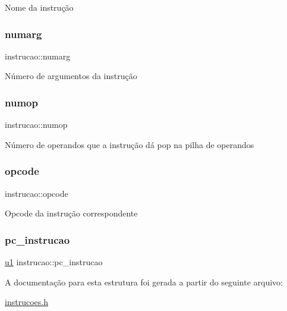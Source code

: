 Nome da instrução \mbox{\label{structinstrucao_abe29e9abb3acf6ab4f1b4690d31b456d}} 
\subsubsection{\texorpdfstring{numarg}{numarg}}
{\footnotesize\ttfamily instrucao\+::numarg}

Número de argumentos da instrução \mbox{\label{structinstrucao_ada3363067b90142344358001d51dd197}} 
\subsubsection{\texorpdfstring{numop}{numop}}
{\footnotesize\ttfamily instrucao\+::numop}

Número de operandos que a instrução dá pop na pilha de operandos \mbox{\label{structinstrucao_a588fa0d2c21e3de3d31382cdd08a3f6c}} 
\subsubsection{\texorpdfstring{opcode}{opcode}}
{\footnotesize\ttfamily instrucao\+::opcode}

Opcode da instrução correspondente \mbox{\label{structinstrucao_adf700f8998ffadaabba2ebf5aa4f6e21}} 
\subsubsection{\texorpdfstring{pc\+\_\+instrucao}{pc\_instrucao}}
{\footnotesize\ttfamily \hyperlink{lista__operandos_8h_ad9f4cdb6757615aae2fad89dab3c5470}{u1} instrucao\+::pc\+\_\+instrucao}



A documentação para esta estrutura foi gerada a partir do seguinte arquivo\+:\begin{DoxyCompactItemize}
\item 
\hyperlink{instrucoes_8h}{instrucoes.\+h}\end{DoxyCompactItemize}
